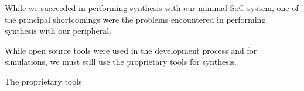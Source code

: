 \documentclass[a4paper,8pt]{report}
\begin{document}
While we succeeded in performing synthesis with our minimal SoC system, one of
the principal shortcomings were the problems encountered in performing synthesis
with our peripheral.

While open source tools were used in the development process and for
simulations, we must still use the proprietary tools for synthesis.

The proprietary tools 






\appendix
\singlespacing

\printbibliography
\end{document}

